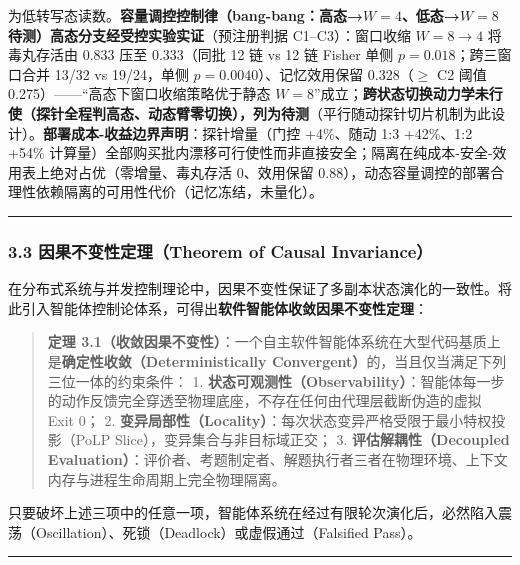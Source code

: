 \documentclass[
]{ctexart}
\renewcommand{\_}{\discretionary{}{}{\textunderscore}}
\begin{document}
\begin{itemize}
  为低转写态读数。\textbf{容量调控控制律（bang-bang：高态→\(W{=}4\)、低态→\(W{=}8\)
  待测）高态分支经受控实验实证}（预注册判据 C1--C3）：窗口收缩
  \(W{=}8\to4\) 将毒丸存活由 0.833 压至 0.333（同批 12 链 vs 12 链
  Fisher 单侧 \(p{=}0.018\)；跨三窗口合并 13/32 vs 19/24，单侧
  \(p{=}0.0040\)）、记忆效用保留 0.328（\(\ge\) C2 阈值
  0.275）------``高态下窗口收缩策略优于静态
  \(W{=}8\)''成立；\textbf{跨状态切换动力学未行使（探针全程判高态、动态臂零切换），列为待测}（平行随动探针切片机制为此设计）。\textbf{部署成本-收益边界声明}：探针增量（门控
  +4\%、随动 1:3 +42\%、1:2 +54\%
  计算量）全部购买批内漂移可行使性而非直接安全；隔离在纯成本-安全-效用表上绝对占优（零增量、毒丸存活
  0、效用保留
  0.88），动态容量调控的部署合理性依赖隔离的可用性代价（记忆冻结，未量化）。
\end{itemize}

\begin{center}\rule{0.5\linewidth}{0.5pt}\end{center}

\subsubsection{3.3 因果不变性定理（Theorem of Causal
Invariance）}\label{ux56e0ux679cux4e0dux53d8ux6027ux5b9aux7406theorem-of-causal-invariance}

在分布式系统与并发控制理论中，因果不变性保证了多副本状态演化的一致性。将此引入智能体控制论体系，可得出\textbf{软件智能体收敛因果不变性定理}：

\begin{quote}
\textbf{定理
3.1（收敛因果不变性）}：一个自主软件智能体系统在大型代码基质上是\textbf{确定性收敛（Deterministically
Convergent）}的，当且仅当满足下列三位一体的约束条件： 1.
\textbf{状态可观测性（Observability）}：智能体每一步的动作反馈完全穿透至物理底座，不存在任何由代理层截断伪造的虚拟
Exit 0； 2.
\textbf{变异局部性（Locality）}：每次状态变异严格受限于最小特权投影（PoLP
Slice），变异集合与非目标域正交； 3. \textbf{评估解耦性（Decoupled
Evaluation）}：评价者、考题制定者、解题执行者三者在物理环境、上下文内存与进程生命周期上完全物理隔离。
\end{quote}

只要破坏上述三项中的任意一项，智能体系统在经过有限轮次演化后，必然陷入震荡（Oscillation）、死锁（Deadlock）或虚假通过（Falsified
Pass）。

\begin{center}\rule{0.5\linewidth}{0.5pt}\end{center}
\end{document}
